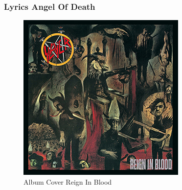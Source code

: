\documentclass[twocolumn,10pt]{article}
\begin{document}
			\subsubsection{Lyrics Angel Of Death}\label{laod}
			\begin{figure}[H]
				\centering\includegraphics[width=\linewidth]{ReignInBlood.jpg}
				\caption{Album Cover Reign In Blood}
			\end{figure}
\end{document}
